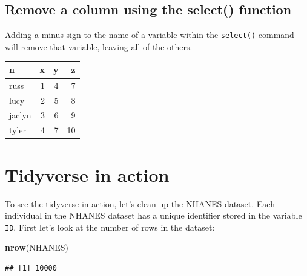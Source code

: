 \documentclass[12pt,]{book}
\newenvironment{Shaded}{\begin{snugshade}}{\end{snugshade}}
\newcommand{\KeywordTok}[1]{\textcolor[rgb]{0.13,0.29,0.53}{\textbf{#1}}}
\newcommand{\NormalTok}[1]{#1}
\newcommand{\OperatorTok}[1]{\textcolor[rgb]{0.81,0.36,0.00}{\textbf{#1}}}
\newcommand{\StringTok}[1]{\textcolor[rgb]{0.31,0.60,0.02}{#1}}
\begin{document}
\hypertarget{remove-a-column-using-the-select-function}{%
\subsection{Remove a column using the select() function}\label{remove-a-column-using-the-select-function}}

Adding a minus sign to the name of a variable within the \texttt{select()} command will remove that variable, leaving all of the others.

\begin{Shaded}
\end{Shaded}

\begin{tabular}{l|r|r|r}
\hline
n & x & y & z\\
\hline
russ & 1 & 4 & 7\\
\hline
lucy & 2 & 5 & 8\\
\hline
jaclyn & 3 & 6 & 9\\
\hline
tyler & 4 & 7 & 10\\
\hline
\end{tabular}

\hypertarget{tidyverse-in-action}{%
\section{Tidyverse in action}\label{tidyverse-in-action}}

To see the tidyverse in action, let's clean up the NHANES dataset. Each individual in the NHANES dataset has a unique identifier stored in the variable \texttt{ID}. First let's look at the number of rows in the dataset:

\begin{Shaded}
\begin{Highlighting}[]
\KeywordTok{nrow}\NormalTok{(NHANES)}
\end{Highlighting}
\end{Shaded}

\begin{verbatim}
## [1] 10000
\end{verbatim}
\end{document}
